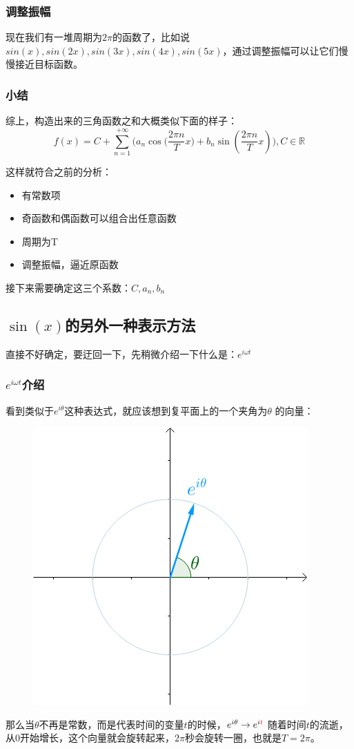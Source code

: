 \documentclass[12pt]{article}
\begin{document}
\subsubsection{调整振幅}
现在我们有一堆周期为$2\pi$的函数了，比如说$sin(x),sin(2x),sin(3x),sin(4x),sin(5x)$，通过调整振幅可以让它们慢慢接近目标函数。

\subsubsection{小结}
综上，构造出来的三角函数之和大概类似下面的样子：
$$
f(x) = C + \sum_{n=1}^{+\infty}\big(a_n\cos{(\frac{2\pi n}{T}}x) + b_n\sin(\frac{2\pi n}{T}x)\big), C \in \mathbb{R}
$$

这样就符合之前的分析：
\begin{itemize}
    \item 有常数项
    \item 奇函数和偶函数可以组合出任意函数
    \item 周期为T
    \item 调整振幅，逼近原函数
\end{itemize}

接下来需要确定这三个系数：$C, {a_n}, {b_n}$

\subsection{$\sin(x)$的另外一种表示方法}
直接不好确定，要迂回一下，先稍微介绍一下什么是：$e^{i\omega  t}$

\subsubsection{$e^{i\omega t}$介绍}
看到类似于$e^{i\theta}$这种表达式，就应该想到复平面上的一个夹角为$\theta$ 的向量：
\begin{figure}[H]
  \centering
  \includegraphics[width=.3\textwidth]{fig/eitheta图像.png} 
\end{figure}
那么当$\theta$不再是常数，而是代表时间的变量$t$的时候，$e^{i\theta}\to e^{i{\color{red}t}}$
随着时间$t$的流逝，从0开始增长，这个向量就会旋转起来，$2\pi$秒会旋转一圈，也就是$T=2\pi$。
\end{document}

